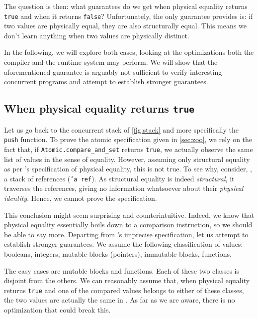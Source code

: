 The question is then: what guarantees do we get when physical equality returns \texttt{true} and when it returns \texttt{false}?
Unfortunately, the only guarantee \OCaml provides is: if two values are physically equal, they are also structurally equal.
This means we don't learn anything when two values are physically distinct.

In the following, we will explore both cases, looking at the optimizations both the compiler and the runtime system may perform.
We will show that the aforementioned guarantee is arguably not sufficient to verify interesting concurrent programs and attempt to establish stronger guarantees.

\subsection{When physical equality returns \texttt{true}}

Let us go back to the concurrent stack of \cref{fig:stack} and more specifically the \texttt{push} function.
To prove the atomic specification given in \cref{sec:zoo}, we rely on the fact that, if \texttt{Atomic.compare_and_set} returns \texttt{true}, we actually observe the same list of values in the sense of \Rocq equality.
However, assuming only structural equality as per \OCaml's specification of physical equality, this is not true.
To see why, consider, \eg, a stack of references (\texttt{'a ref}).
As structural equality is indeed \emph{structural}, it traverses the references, giving no information whatsoever about their \emph{physical identity}.
Hence, we cannot prove the specification.

This conclusion might seem surprising and counterintuitive.
Indeed, we know that physical equality essentially boils down to a comparison instruction, so we should be able to say more.
Departing from \OCaml's imprecise specification, let us attempt to establish stronger guarantees.
We assume the following classification of values: booleans, integers, mutable blocks (pointers), immutable blocks, functions.

The easy cases are mutable blocks and functions.
Each of these two classes is disjoint from the others.
We can reasonably assume that, when physical equality returns \texttt{true} and one of the compared values belongs to either of these classes, the two values are actually the same in \Rocq.
As far as we are aware, there is no optimization that could break this.

